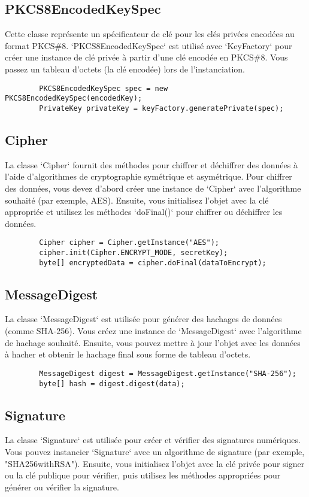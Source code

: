 \documentclass[a4paper,12pt]{report}
\begin{document}
	\subsection{PKCS8EncodedKeySpec}
	Cette classe représente un spécificateur de clé pour les clés privées encodées au format PKCS\#8. `PKCS8EncodedKeySpec` est utilisé avec `KeyFactory` pour créer une instance de clé privée à partir d'une clé encodée en PKCS\#8. Vous passez un tableau d'octets (la clé encodée) lors de l'instanciation.
	
	\begin{verbatim}
		PKCS8EncodedKeySpec spec = new PKCS8EncodedKeySpec(encodedKey);
		PrivateKey privateKey = keyFactory.generatePrivate(spec);
	\end{verbatim}
	
	\subsection{Cipher}
	La classe `Cipher` fournit des méthodes pour chiffrer et déchiffrer des données à l'aide d'algorithmes de cryptographie symétrique et asymétrique. Pour chiffrer des données, vous devez d'abord créer une instance de `Cipher` avec l'algorithme souhaité (par exemple, AES). Ensuite, vous initialisez l'objet avec la clé appropriée et utilisez les méthodes `doFinal()` pour chiffrer ou déchiffrer les données.
	
	\begin{verbatim}
		Cipher cipher = Cipher.getInstance("AES");
		cipher.init(Cipher.ENCRYPT_MODE, secretKey);
		byte[] encryptedData = cipher.doFinal(dataToEncrypt);
	\end{verbatim}
	
	\subsection{MessageDigest}
	La classe `MessageDigest` est utilisée pour générer des hachages de données (comme SHA-256). Vous créez une instance de `MessageDigest` avec l'algorithme de hachage souhaité. Ensuite, vous pouvez mettre à jour l'objet avec les données à hacher et obtenir le hachage final sous forme de tableau d'octets.
	
	\begin{verbatim}
		MessageDigest digest = MessageDigest.getInstance("SHA-256");
		byte[] hash = digest.digest(data);
	\end{verbatim}
	
	\subsection{Signature}
	La classe `Signature` est utilisée pour créer et vérifier des signatures numériques. Vous pouvez instancier `Signature` avec un algorithme de signature (par exemple, "SHA256withRSA"). Ensuite, vous initialisez l'objet avec la clé privée pour signer ou la clé publique pour vérifier, puis utilisez les méthodes appropriées pour générer ou vérifier la signature.
	
\end{document}
